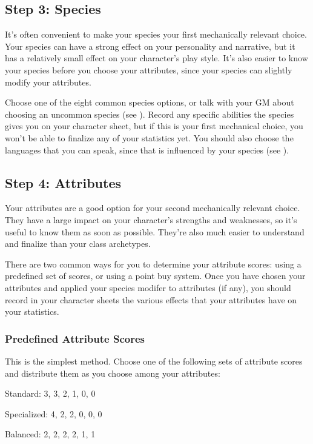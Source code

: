     \subsection{Step 3: Species}
        It's often convenient to make your species your first mechanically relevant choice.
        Your species can have a strong effect on your personality and narrative, but it has a relatively small effect on your character's play style.
        It's also easier to know your species before you choose your attributes, since your species can slightly modify your attributes.

        Choose one of the eight common species options, or talk with your GM about choosing an uncommon species (see ).
        Record any specific abilities the species gives you on your character sheet, but if this is your first mechanical choice, you won't be able to finalize any of your statistics yet.
        You should also choose the languages that you can speak, since that is influenced by your species (see ).

    \subsection{Step 4: Attributes}
        Your attributes are a good option for your second mechanically relevant choice.
        They have a large impact on your character's strengths and weaknesses, so it's useful to know them as soon as possible.
        They're also much easier to understand and finalize than your class archetypes.

        There are two common ways for you to determine your attribute scores: using a predefined set of scores, or using a point buy system.
        Once you have chosen your attributes and applied your species modifer to attributes (if any), you should record in your character sheets the various effects that your attributes have on your statistics.

        \subsubsection{Predefined Attribute Scores}
            This is the simplest method.
            Choose one of the following sets of attribute scores and distribute them as you choose among your attributes:
            \begin{raggeditemize}
                \item Standard: 3, 3, 2, 1, 0, 0
                \item Specialized: 4, 2, 2, 0, 0, 0
                \item Balanced: 2, 2, 2, 2, 1, 1
            \end{raggeditemize}

